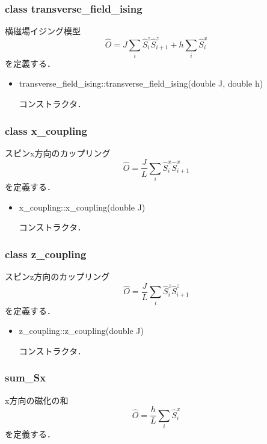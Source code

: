 \documentclass[report, 11pt, uplatex]{jsbook}
\begin{document}
	\subsubsection{class transverse\_field\_ising}
	横磁場イジング模型
	\begin{equation}
	\hat{O}=J\sum_{i}\hat{S}^z_i\hat{S}^z_{i+1}+h\sum_i\hat{S}^x_i\nonumber
	\end{equation}
	を定義する．
	
	\begin{itemize}
		\item transverse\_field\_ising::transverse\_field\_ising(double J, double h)
		
		コンストラクタ．
	\end{itemize}
	
	\subsubsection{class x\_coupling}
	スピンx方向のカップリング
	\begin{equation}
	\hat{O}=\frac{J}{L}\sum_i\hat{S}^x_i\hat{S}^x_{i+1}\nonumber
	\end{equation}
	を定義する．
	
	\begin{itemize}
		\item x\_coupling::x\_coupling(double J)
		
		コンストラクタ．
	\end{itemize}

	\subsubsection{class z\_coupling}
	スピンz方向のカップリング
	\begin{equation}
	\hat{O}=\frac{J}{L}\sum_i\hat{S}^z_i\hat{S}^z_{i+1}\nonumber
	\end{equation}
	を定義する．
	
	\begin{itemize}
		\item z\_coupling::z\_coupling(double J)
		
		コンストラクタ．
	\end{itemize}
	
	\subsubsection{sum\_Sx}
	x方向の磁化の和
	\begin{equation}
	\hat{O}=\frac{h}{L}\sum_i\hat{S}^x_i\nonumber
	\end{equation}
	を定義する．
	
\end{document}
